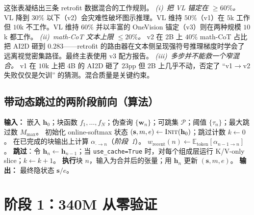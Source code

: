 \documentclass{article}
\newcommand{\attnres}{\textsc{AttnRes}}
\newcommand{\reskip}{\textsc{ReSkip}}
\newcommand{\E}{\mathbb{E}}
\begin{document}
这张表凝结出三条 retrofit 数据混合的工作规则。
\emph{(i)~把 VL 锚定在 $\geq 60\%$。} VL 降到 $30\%$ 以下（v2）会灾难性破坏图示推理。VL 维持 $50\%$（v1）在 $5$k 工作但 $10$k 不工作。VL 维持 $60\%$ 并以丰富的 OneVision 锚定（v3）则在两种规模 $10$k 都工作。
\emph{(ii)~math-CoT 文本上限 $\leq 20\%$。} v2 在 2B 上 $40\%$ math-CoT 占比把 AI2D 砸到 $0.283$——retrofit 的路由器在文本侧呈现强符号推理梯度时学会了远离视觉密集路径。最终主表使用 v3 配方报告。
\emph{(iii)~多步并不能救一个窄混合。} v1 在 $10$k 上把 4B 的 AI2D 砸了 $23$pp 但 2B 上几乎不动，否定了 ``v1$\to$v2 失败仅仅是欠训'' 的猜测。混合质量是关键约束。

\subsection{带动态跳过的两阶段前向（算法）}
\label{app:algorithm}
\begin{algorithm}[h]
\caption{带动态 \reskip{} 的两阶段 \attnres{} 前向。}
\label{alg:two_phase}
\begin{algorithmic}[1]
\STATE \textbf{输入：} 嵌入 $\mathbf{h}_0$；块函数 $f_1,\dots,f_N$；伪查询 $\{\mathbf{w}_n\}$；可跳集 $\mathcal{P}$；阈值 $\{\tau_n\}$；最大跳过数 $M_{\max}$。
\STATE 初始化 online-softmax 状态 $(\mathbf{s}, m, e) \gets \textsc{Init}(\mathbf{h}_0)$；跳过计数 $k \gets 0$。
  \STATE 在已完成的块输出上计算 $\alpha_{\cdot \to n}$（\emph{阶段~1}）。
  \STATE $w_{\text{recent}}(n) \gets \E_{\text{token}}[\alpha_{n-1\to n}]$。
    \STATE \textbf{跳过}：令 $\mathbf{h}_n \gets \mathbf{h}_{n-1}$；当 \texttt{use\_cache=True} 时，对每个组成层运行 K/V-only slice；$k \gets k+1$。
  \ELSE
    \STATE \textbf{执行}块 $n$，输入为合并后的张量；用 $\mathbf{h}_n$ 更新 $(\mathbf{s},m,e)$。
  \ENDIF
\ENDFOR
\STATE \textbf{输出：} 最终隐状态 $\mathbf{s}/e$。
\end{algorithmic}
\end{algorithm}

\section{阶段 1：340M 从零验证}
\label{app:phase1_section}
\end{document}
